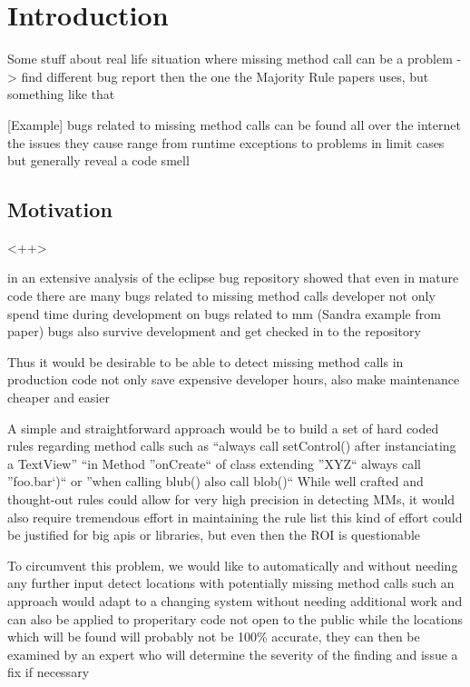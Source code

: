 \chapter{Introduction}\label{chapter:introduction}

Some stuff about real life situation where missing method call can be a problem
-> find different bug report then the one the Majority Rule papers uses, but something like that

[Example]
bugs related to missing method calls can be found all over the internet
the issues they cause range from runtime exceptions to problems in limit cases
but generally reveal a code smell

\section{Motivation}<++>

in an extensive analysis of the eclipse bug repository \cite{monperrus2013detecting} showed
that even in mature code there are many bugs related to missing method calls
developer not only spend time during development on bugs related to mm (Sandra example from paper)
bugs also survive development and get checked in to the repository

Thus it would be desirable to be able to detect missing method calls in production code
not only save expensive developer hours, also make maintenance cheaper and easier

A simple and straightforward approach would be to build a set of hard coded rules regarding method calls such as
``always call setControl() after instanciating a TextView''
``in Method ''onCreate`` of class extending ''XYZ`` always call ''foo.bar`)`` or
''when calling blub() also call blob()``
While well crafted and thought-out rules could allow for very high precision in detecting MMs, it would also require tremendous effort in maintaining the rule list
this kind of effort could be justified for big apis or libraries, but even then the ROI is questionable

To circumvent this problem, we would like to automatically and without needing any further input detect locations with potentially missing method calls
such an approach would adapt to a changing system without needing additional work and can also be applied to properitary code not open to the public
while the locations which will be found will probably not be 100\% accurate, they can then be examined by an expert who will determine the severity of the finding and issue a fix if necessary

